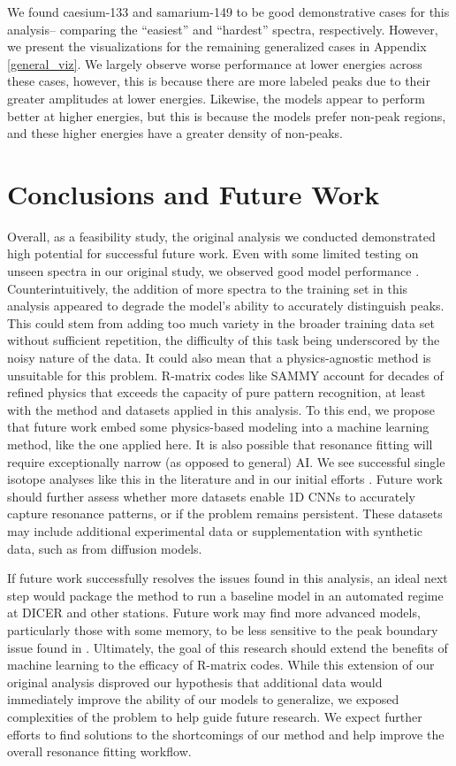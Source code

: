 \documentclass{style/nseJournal}
\begin{document}
We found caesium-133 and samarium-149 to be good demonstrative cases for this analysis-- comparing the ``easiest'' and ``hardest'' spectra, respectively. However, we present the visualizations for the remaining generalized cases in Appendix \ref{general_viz}. We largely observe worse performance at lower energies across these cases, however, this is because there are more labeled peaks due to their greater amplitudes at lower energies. Likewise, the models appear to perform better at higher energies, but this is because the models prefer non-peak regions, and these higher energies have a greater density of non-peaks.

\section{Conclusions and Future Work}
Overall, as a feasibility study, the original analysis we conducted \cite{PHYSOR} demonstrated high potential for successful future work. Even with some limited testing on unseen spectra in our original study, we observed good model performance \cite{PHYSOR}. Counterintuitively, the addition of more spectra to the training set in this analysis appeared to degrade the model's ability to accurately distinguish peaks. This could stem from adding too much variety in the broader training data set without sufficient repetition, the difficulty of this task being underscored by the noisy nature of the data. It could also mean that a physics-agnostic method is unsuitable for this problem. R-matrix codes like SAMMY account for decades of refined physics that exceeds the capacity of pure pattern recognition, at least with the method and datasets applied in this analysis. To this end, we propose that future work embed some physics-based modeling into a machine learning method, like the one applied here. It is also possible that resonance fitting will require exceptionally narrow (as opposed to general) AI. We see successful single isotope analyses like this in the literature \cite{xingPhaseShiftDeep2024} and in our initial efforts \cite{PHYSOR}. Future work should further assess whether more datasets enable 1D CNNs to accurately capture resonance patterns, or if the problem remains persistent. These datasets may include additional experimental data or supplementation with synthetic data, such as from diffusion models.

If future work successfully resolves the issues found in this analysis, an ideal next step would package the method to run a baseline model in an automated regime at DICER and other stations. Future work may find more advanced models, particularly those with some memory, to be less sensitive to the peak boundary issue found in \cite{PHYSOR}. Ultimately, the goal of this research should extend the benefits of machine learning to the efficacy of R-matrix codes. While this extension of our original analysis \cite{PHYSOR} disproved our hypothesis that additional data would immediately improve the ability of our models to generalize, we exposed complexities of the problem to help guide future research. We expect further efforts to find solutions to the shortcomings of our method and help improve the overall resonance fitting workflow.
\end{document}
